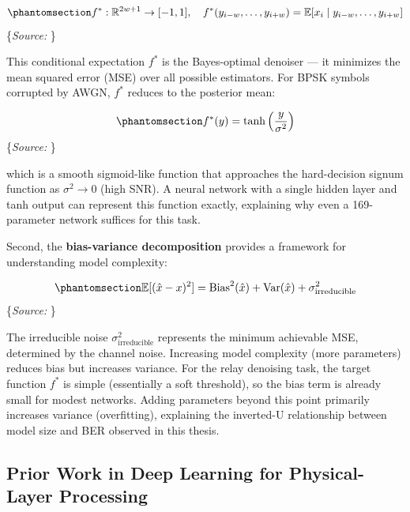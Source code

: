\documentclass[
  english,
  12pt,
  12pt,
  a4paper,
  oneside]{report}
\begin{document}
\begin{equation}\protect\phantomsection\label{eq:optimal-denoiser}{f^*: \mathbb{R}^{2w+1} \to [-1, 1], \quad f^*(y_{i-w}, \dots, y_{i+w}) = \mathbb{E}[x_i \mid y_{i-w}, \dots, y_{i+w}]
}\end{equation} \footnotesize\{\textit{Source: \1}\}\normalsize

This conditional expectation \(f^*\) is the Bayes-optimal denoiser --- it minimizes the mean squared error (MSE) over all possible estimators. For BPSK symbols corrupted by AWGN, \(f^*\) reduces to the posterior mean:

\begin{equation}\protect\phantomsection\label{eq:optimal-denoiser-awgn}{f^*(y) = \tanh\left(\frac{y}{\sigma^2}\right)
}\end{equation} \footnotesize\{\textit{Source: \1}\}\normalsize

which is a smooth sigmoid-like function that approaches the hard-decision signum function as \(\sigma^2 \to 0\) (high SNR). A neural network with a single hidden layer and tanh output can represent this function exactly, explaining why even a 169-parameter network suffices for this task.

Second, the \textbf{bias-variance decomposition} provides a framework for understanding model complexity:

\begin{equation}\protect\phantomsection\label{eq:bias-variance-decomp}{\mathbb{E}[(\hat{x} - x)^2] = \text{Bias}^2(\hat{x}) + \text{Var}(\hat{x}) + \sigma^2_{\text{irreducible}}
}\end{equation} \footnotesize\{\textit{Source: \1}\}\normalsize

The irreducible noise \(\sigma^2_{\text{irreducible}}\) represents the minimum achievable MSE, determined by the channel noise. Increasing model complexity (more parameters) reduces bias but increases variance. For the relay denoising task, the target function \(f^*\) is simple (essentially a soft threshold), so the bias term is already small for modest networks. Adding parameters beyond this point primarily increases variance (overfitting), explaining the inverted-U relationship between model size and BER observed in this thesis.

\subsection{Prior Work in Deep Learning for Physical-Layer Processing}\label{sec:prior-work-in-deep-learning-for-physical-layer-processing}
\end{document}
